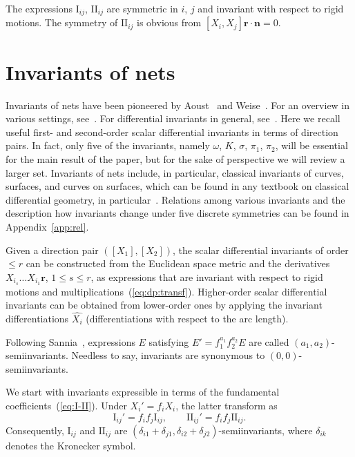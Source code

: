 \documentclass[pdftex]{sigma}
\let\ve\mathbf
\def\I#1#2{\mathrm{I}_{#1#2}}
\def\II#1#2{\mathrm{II}_{#1#2}}
\def\eqref#1{{\rm(\ref{#1})}}
\numberwithin{equation}{section}
\begin{document}
The expressions $\I ij$, $\II ij$ are symmetric in $i$, $j$ and invariant with
respect to rigid motions.
The symmetry of $\II ij$ is obvious from
$[X_i, X_j]\ve r \cdot \ve n = 0$.

\section{Invariants of nets}\label{sect:inv}

Invariants of nets have been pioneered by Aoust~\cite{AA} and Weise~\cite{KHW-1940}.
For an overview in various settings,
see~\cite{YaSD,APN,WS-I,WS-II,WS-III,VIS}.
For differential invariants in general, see~\cite{A-L-V}.
Here we recall useful first- and
second-order scalar differential invariants in terms of direction pairs.
In fact, only five of the invariants, namely $\omega$, $K$, $\sigma$, $\pi_1$, $\pi_2$,
will be  essential for the main result of the paper,
but for the sake of perspective we will review a larger set.
Invariants of nets include, in particular,
classical invariants of curves, surfaces, and curves on surfaces,
which can be found in any textbook on classical differential geometry,
in particular~\cite{Spi-III}.
Relations among various invariants and the description how invariants change
under five discrete symmetries can be found in  Appendix~\ref{app:rel}.

Given a direction pair $([X_1],[X_2])$, the scalar differential invariants of
order $\le r$ can be constructed from
the Euclidean space metric and the derivatives $X_{i_s} \ldots X_{i_1} \ve r$, $1 \le s \le r$, as expressions that are invariant with respect to rigid
motions and multiplications~\eqref{eq:dp:transf}.
Higher-order scalar differential invariants can be obtained from
lower-order ones by applying the invariant differentiations $\widehat{X_i}$
(differentiations with respect to the arc length).

Following Sannia~\cite{GS},
expressions $E$ satisfying
$E' = f_1^{a_1} f_2^{a_2} E$ are called $(a_1,a_2)$-semi\-in\-vari\-ants.
Needless to say, invariants are synonymous to $(0,0)$-semiinvariants.

We start with invariants expressible in terms of the
fundamental coefficients~\eqref{eq:I-II}.
Under $X_i' = f_i X_i$, the latter transform as
\[%
\I ij' = f_i f_j \I ij, \qquad
\II ij' = f_i f_j \II ij.
\]
Consequently, $\I ij$ and $\II ij$ are
$(\delta_{i1} + \delta_{j1}, \delta_{i2} + \delta_{j2})$-semiinvariants,
where $\delta_{ik}$ denotes the Kronecker symbol.
\end{document}
